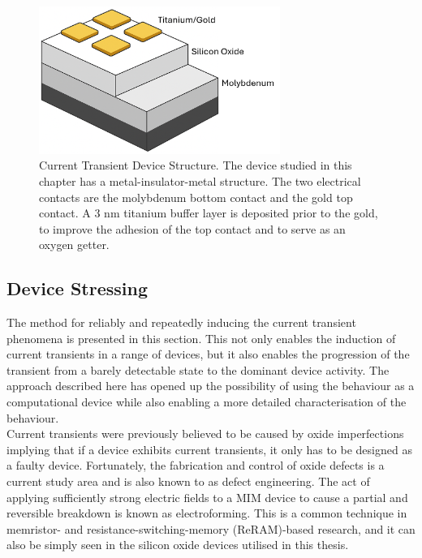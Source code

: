 \begin{figure}[htbp!] 
    \centering    
    \includegraphics[width=0.7\textwidth]{Chapter4/Figs/c.png}
    \caption[Current Transient Device Structure]{Current Transient Device Structure. The device studied in this chapter has a metal-insulator-metal structure. The two electrical contacts are the molybdenum bottom contact and the gold top contact. A 3 nm titanium buffer layer is deposited prior to the gold, to improve the adhesion of the top contact and to serve as an oxygen getter.}
    \label{fig:4c}
\end{figure}

\subsection[Device Stressing]{Device Stressing}

The method for reliably and repeatedly inducing the current transient phenomena is presented in this section. This not only enables the induction of current transients in a range of devices, but it also enables the progression of the transient from a barely detectable state to the dominant device activity. The approach described here has opened up the possibility of using the behaviour as a computational device while also enabling a more detailed characterisation of the behaviour. \\

\noindent Current transients were previously believed to be caused by oxide imperfections implying that if a device exhibits current transients, it only has to be designed as a faulty device. Fortunately, the fabrication and control of oxide defects is a current study area and is also known to as defect engineering. The act of applying sufficiently strong electric fields to a MIM device to cause a partial and reversible breakdown is known as electroforming. This is a common technique in memristor- and resistance-switching-memory (ReRAM)-based research, and it can also be simply seen in the silicon oxide devices utilised in this thesis.\\

